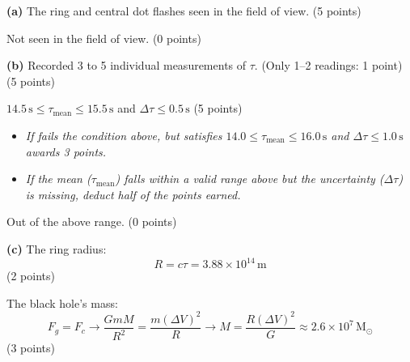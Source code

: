 \textbf{(a)} The ring and central dot flashes seen in the field of view.
\hfill(5 points)

Not seen in the field of view. \hfill(0 points)

\textbf{(b)} Recorded 3 to 5 individual measurements of $\tau$. (Only 1--2
readings: 1 point) \hfill(5 points)

$14.5\,\mathrm{s} \le \tau_{\mathrm{mean}} \le 15.5\,\mathrm{s}$ and
$\Delta\tau \le 0.5\,\mathrm{s}$ \hfill(5 points)
\begin{itemize}
\item \textit{If fails the condition above, but satisfies
  $14.0 \le \tau_{\mathrm{mean}} \le 16.0\,\mathrm{s}$ and
  $\Delta\tau \le 1.0\,\mathrm{s}$ awards 3 points.}
\item \textit{If the mean ($\tau_{\mathrm{mean}}$) falls within a valid range
  above but the uncertainty ($\Delta\tau$) is missing, deduct half of the
  points earned.}
\end{itemize}

Out of the above range. \hfill(0 points)

\textbf{(c)} The ring radius:
\[ R = c\tau = 3.88 \times 10^{14}\,\mathrm{m} \]
\hfill(2 points)

The black hole's mass:
\[ F_g = F_c \rightarrow \frac{GmM}{R^2} = \frac{m(\Delta V)^2}{R}
   \rightarrow M = \frac{R(\Delta V)^2}{G} \approx 2.6 \times 10^{7}\,\mathrm{M}_\odot \]
\hfill(3 points)
